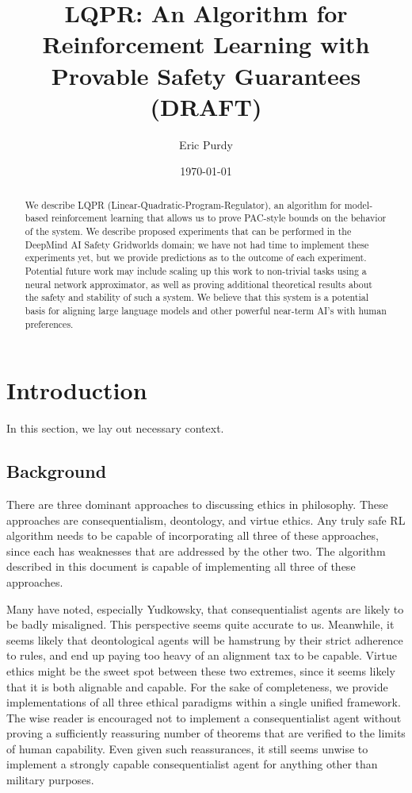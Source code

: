 \documentclass[11pt]{article}
\title{LQPR: An Algorithm for Reinforcement Learning with Provable Safety Guarantees (DRAFT)}
\author{Eric Purdy}
\date{\today}
\begin{document}
\maketitle

\begin{abstract}
We describe LQPR (Linear-Quadratic-Program-Regulator), an algorithm
for model-based reinforcement learning that allows us to prove
PAC-style bounds on the behavior of the system. We describe proposed
experiments that can be performed in the DeepMind AI Safety Gridworlds
domain; we have not had time to implement these experiments yet, but
we provide predictions as to the outcome of each experiment. Potential
future work may include scaling up this work to non-trivial tasks
using a neural network approximator, as well as proving additional
theoretical results about the safety and stability of such a
system. We believe that this system is a potential basis for aligning
large language models and other powerful near-term AI's with human
preferences.
\end{abstract}

\section{Introduction}

In this section, we lay out necessary context.

\subsection{Background}
There are three dominant approaches to discussing ethics in
philosophy. These approaches are consequentialism, deontology, and
virtue ethics. Any truly safe RL algorithm needs to be capable of
incorporating all three of these approaches, since each has weaknesses
that are addressed by the other two. The algorithm described in this
document is capable of implementing all three of these approaches.

Many have noted, especially Yudkowsky, that consequentialist agents
are likely to be badly misaligned. This perspective seems quite
accurate to us. Meanwhile, it seems likely that deontological agents
will be hamstrung by their strict adherence to rules, and end up
paying too heavy of an alignment tax to be capable. Virtue ethics
might be the sweet spot between these two extremes, since it seems
likely that it is both alignable and capable. For the sake of
completeness, we provide implementations of all three ethical
paradigms within a single unified framework. The wise reader is
encouraged not to implement a consequentialist agent without proving a
sufficiently reassuring number of theorems that are verified to the
limits of human capability. Even given such reassurances, it still
seems unwise to implement a strongly capable consequentialist agent
for anything other than military purposes.
\end{document}
